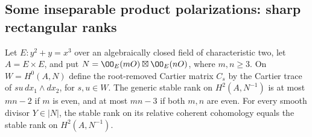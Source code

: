 \subsection{Some inseparable product polarizations: sharp rectangular ranks}
\label{sec:ss-rectangular-ranks}

\begin{lemma}
\label{lem:ss-rectangular-even-bound}
Let $E:y^2+y=x^3$ over an algebraically closed field of characteristic
two, let $A=E\times E$, and put
$N=\OO_E(mO)\boxtimes\OO_E(nO)$, where $m,n\ge3$.
On $W=H^0(A,N)$ define the root-removed Cartier matrix $C_s$ by
the Cartier trace of $su\,dx_1\wedge dx_2$, for $s,u\in W$.
The generic stable rank on $H^2(A,N^{-1})$ is at most
$mn-2$ if $m$ is even, and at most $mn-3$ if both $m,n$ are even.
For every smooth divisor $Y\in|N|$, the stable rank on its relative
coherent cohomology equals the stable rank on $H^2(A,N^{-1})$.
\end{lemma}
